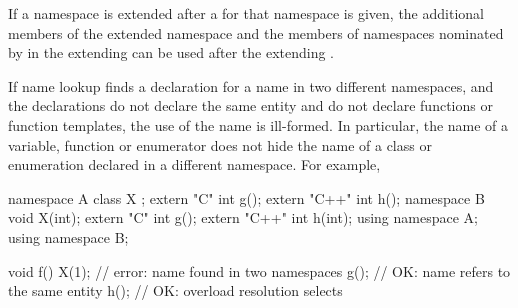\pnum
If a namespace is extended after a
 for that namespace is given, the additional
members of the extended namespace and the members of namespaces
nominated by  in the
extending  can be used after the
extending .

\pnum
\begin{note}
If name lookup finds a declaration for a name in two different
namespaces, and the declarations do not declare the same entity and do
not declare functions or function templates, the use of the name is ill-formed.
In particular, the name of a variable, function or enumerator does not
hide the name of a class or enumeration declared in a different
namespace. For example,

\begin{codeblock}
namespace A {
  class X { };
  extern "C"   int g();
  extern "C++" int h();
}
namespace B {
  void X(int);
  extern "C"   int g();
  extern "C++" int h(int);
}
using namespace A;
using namespace B;

void f() {
  X(1);             // error: name  found in two namespaces
  g();              // OK: name  refers to the same entity
  h();              // OK: overload resolution selects 
}
\end{codeblock}
\end{note}

